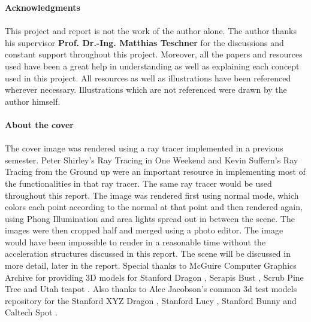 \documentclass[11pt,a4paper]{article}
\begin{document}
\noindent
\textbf{\Large{Acknowledgments}}
\\~\\
This project and report is not the work of the author alone. The author thanks his supervisor \textbf{Prof.
	Dr.-Ing. Matthias Teschner} for the discussions and constant support throughout this project. Moreover, all the papers and resources used have been a great help in understanding as well as explaining each concept used in this project. All resources as well as illustrations have been referenced wherever necessary. Illustrations which are not referenced were drawn by the author himself.
\\~\\
\noindent
\textbf{\Large{About the cover}}
\\~\\
The cover image was rendered using a ray tracer implemented in a previous semester. Peter Shirley's Ray Tracing in One Weekend \cite{Shirley2020RTW1} and Kevin Suffern's Ray Tracing from the Ground up \cite{suffern2016ray} were an important resource in implementing most of the functionalities in that ray tracer. The same ray tracer would be used throughout this report. The image was rendered first using normal mode, which colors each point according to the normal at that point and then rendered again, using Phong Illumination and area lights spread out in between the scene. The images were then cropped half and merged using a photo editor. The image would have been impossible to render in a reasonable time without the acceleration structures discussed in this report. The scene will be discussed in more detail, later in the report. Special thanks to McGuire Computer Graphics Archive \cite{McGuire2017Data} for providing 3D models for Stanford Dragon \cite{stanforddragon}, Serapis Bust \cite{serapis}, Scrub Pine Tree \cite{pinetree} and Utah teapot \cite{utahteapot}. Also thanks to Alec Jacobson's common 3d test models repository \cite{common3dmodels} for the Stanford XYZ Dragon \cite{stanfordxyzdragon}, Stanford Lucy \cite{stanfordlucy}, Stanford Bunny \cite{stanfordbunny} and Caltech Spot \cite{spot}.

\pagebreak
\tableofcontents
\pagebreak
\end{document}
